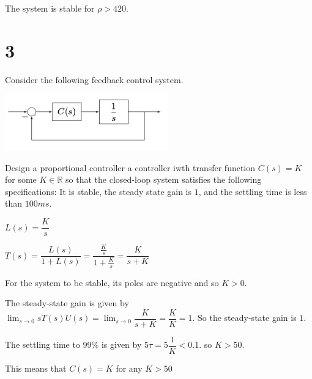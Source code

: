 \documentclass[11pt]{article}
\begin{document}
The system is stable for $\rho > 420$.

\section{3}

Consider the following feedback control system.

\includegraphics[width=200pt]{a3_q3.png}

Design a proportional controller a controller iwth transfer function $C(s) = K$ for some $K \in \mathbb{R}$ so that the closed-loop system satisfies the following specifications: It is stable, the steady state gain is $1$, and the settling time is less than $100ms$.

$L(s) = \dfrac{K}{s}$

$T(s) = \dfrac{L(s)}{1 + L(s)} = \dfrac{\frac{K}{s}}{1 + \frac{K}{s}} = \dfrac{K}{s + K}$

For the system to be stable, its poles are negative and so $K > 0$.

The steady-state gain is given by $\lim_{s \xrightarrow{} 0} s T(s) U(s) = \lim_{s \xrightarrow{} 0} \dfrac{K}{s + K} = \dfrac{K}{K} = 1$. So the steady-state gain is $1$. 

The settling time to 99\% is given by $5 \tau = 5 \dfrac{1}{K} < 0.1$. so $K > 50$.

This means that $C(s) = K$ for any $K > 50$
\end{document}
